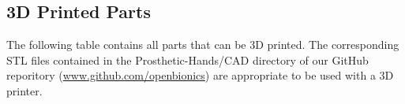 \begin{center}
%
\end{center}

\newpage

\subsection{3D Printed Parts}

The following table contains all parts that can be 3D printed. The corresponding STL files contained in the Prosthetic-Hands/CAD directory of our GitHub reporitory (\url{www.github.com/openbionics}) are appropriate to be used with a 3D printer. 


\vspace{0.2cm}

